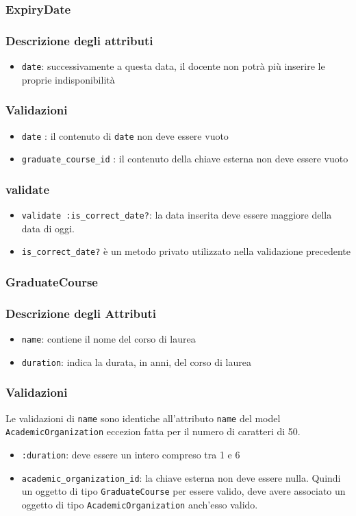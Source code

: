 \documentclass[11pt,a4paper]{article}
\begin{document}
\subsubsection{ExpiryDate}
\subsubsection*{Descrizione degli attributi}
\begin{itemize}
 \item \verb|date|: successivamente a questa data, il docente non potrà più inserire le proprie indisponibilità
\end{itemize}
\subsubsection*{Validazioni}
\begin{itemize}
 \item \verb|date| : il contenuto di \verb|date| non deve essere vuoto
 \item \verb|graduate_course_id| : il contenuto della chiave esterna non deve essere vuoto
\end{itemize}
\subsubsection*{validate}
\begin{itemize}
 \item \verb|validate :is_correct_date?|: la data inserita deve essere maggiore della data di oggi. 
 \item \verb|is_correct_date?| è un metodo privato utilizzato nella validazione precedente
\end{itemize}

\subsubsection{GraduateCourse}
\subsubsection*{Descrizione degli Attributi}
\begin{itemize}
 \item \verb|name|: contiene il nome del corso di laurea
 \item \verb|duration|: indica la durata, in anni, del corso di laurea
\end{itemize}
\subsubsection*{Validazioni}
Le validazioni di \verb|name| sono identiche all'attributo \verb|name| del model \\ \verb|AcademicOrganization| eccezion fatta per il numero di caratteri di 50.
\begin{itemize}
\item \verb|:duration|: deve essere un intero compreso tra 1 e 6
\item \verb|academic_organization_id|: la chiave esterna non deve essere nulla. Quindi un oggetto di tipo \verb|GraduateCourse| per essere valido, deve avere associato un oggetto di tipo \verb|AcademicOrganization| anch'esso valido.
\end{itemize}
\end{document}
